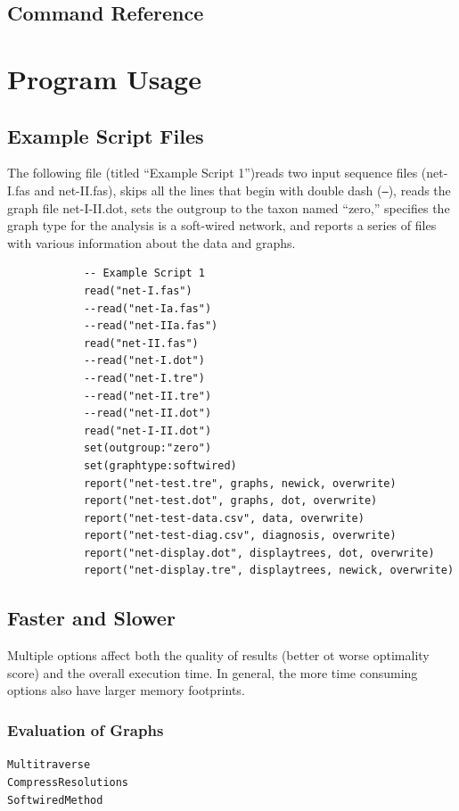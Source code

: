 \documentclass[11pt]{book}
\begin{document}
{%

\section{Command Reference}
	

\chapter{Program Usage}
\section{Example Script Files}
	The following file (titled ``Example Script 1'')reads two input sequence files (net-I.fas and net-II.fas), 
	skips all 	the lines that begin with double dash (\texttt{--}), reads the graph file net-I-II.dot, sets the 
	outgroup to the taxon named ``zero,'' specifies the graph type for the analysis is a soft-wired network, 
	and 	reports a series of files with various information about the data and graphs.
	
		\begin{verbatim}
			-- Example Script 1
			read("net-I.fas")
			--read("net-Ia.fas")
			--read("net-IIa.fas")
			read("net-II.fas")
			--read("net-I.dot")
			--read("net-I.tre")
			--read("net-II.tre")
			--read("net-II.dot")
			read("net-I-II.dot")
			set(outgroup:"zero")
			set(graphtype:softwired)
			report("net-test.tre", graphs, newick, overwrite)
			report("net-test.dot", graphs, dot, overwrite)
			report("net-test-data.csv", data, overwrite)
			report("net-test-diag.csv", diagnosis, overwrite)
			report("net-display.dot", displaytrees, dot, overwrite)
			report("net-display.tre", displaytrees, newick, overwrite)
		\end{verbatim}
	
\section{Faster and Slower}
Multiple options affect both the quality of results (better ot worse optimality score) and
the overall execution time.  In general, the more time consuming options also have larger
memory footprints.

\subsection{Evaluation of Graphs}
	\texttt{Multitraverse}\\
	\texttt{CompressResolutions}\\
	\texttt{SoftwiredMethod}\\

}
\end{document}
